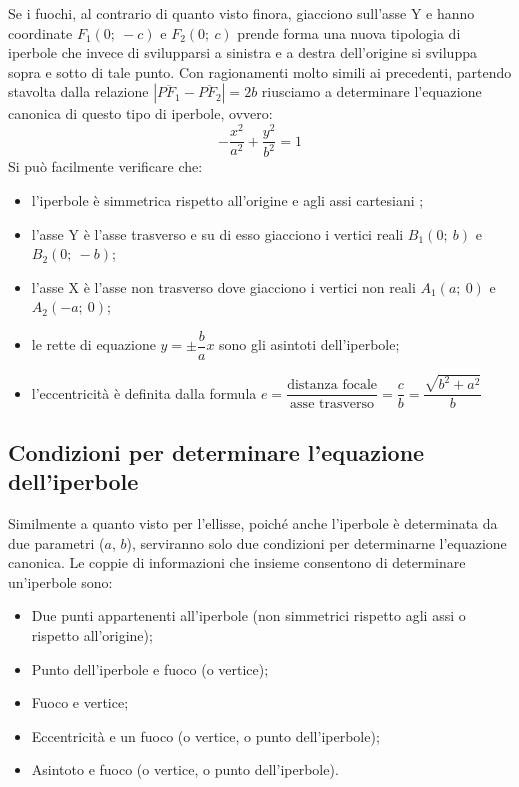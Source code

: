 Se i fuochi, al contrario di quanto visto finora, giacciono sull'asse Y e 
hanno coordinate \( F_{1} (0;~-c)\) e \( F_{2} (0;~c)\) prende forma una nuova 
tipologia di iperbole che invece di svilupparsi a sinistra e a destra 
dell'origine si sviluppa sopra e sotto di tale punto.
Con ragionamenti molto simili ai precedenti, partendo stavolta dalla relazione 
\(\left|\overline{PF_{1}}-\overline{PF_{2}}\right|=2b\) riusciamo a 
determinare l'equazione canonica di questo tipo di iperbole, ovvero: 
\begin{equation*}
-\dfrac{x^{2}}{a^{2}}+\dfrac{y^{2}}{b^{2}}=1
\end{equation*}
Si può facilmente verificare che:
\begin{itemize} [noitemsep]
  \item l'iperbole è simmetrica rispetto all'origine e agli assi 
cartesiani ;
  \item l'asse Y è l'asse trasverso e su di esso giacciono i vertici 
reali \( B_{1} (0;~b)\) e \( B_{2} (0;~-b)\);
  \item l'asse X è l'asse non trasverso dove giacciono i vertici non 
reali \( A_{1} (a;~0)\) e \( A_{2} (-a;~0)\);
  \item le rette di equazione \(y= \pm \dfrac{b}{a}  x\) sono gli asintoti 
dell'iperbole;
  \item l'eccentricità è definita dalla formula 
\(e=\dfrac{\text{distanza focale}}{\text{asse trasverso}}=
\dfrac{c}{b}=\dfrac{\sqrt{b^{2}+a^{2}}}{b} \)
\end{itemize}

\subsection{Condizioni per determinare l'equazione dell'iperbole}

Similmente a quanto visto per l'ellisse, poiché anche l'iperbole 
è determinata da due parametri (\(a\), \(b\)), serviranno solo due condizioni 
per 
determinarne l'equazione canonica.
Le coppie di informazioni che insieme consentono di determinare un'iperbole 
sono:
\begin{itemize}[noitemsep]
\item Due punti appartenenti all'iperbole (non simmetrici rispetto 
agli assi o rispetto all'origine);
\item Punto dell'iperbole e fuoco (o vertice);
\item Fuoco e vertice;
\item Eccentricità e un fuoco (o vertice, o punto dell'iperbole);
\item Asintoto e fuoco (o vertice, o punto dell'iperbole).
\end{itemize}

